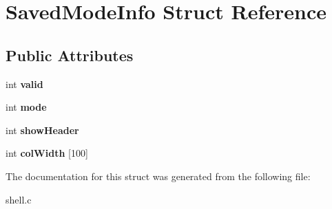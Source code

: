 \hypertarget{structSavedModeInfo}{}\section{Saved\+Mode\+Info Struct Reference}
\label{structSavedModeInfo}
\subsection*{Public Attributes}
\begin{DoxyCompactItemize}
\item 
int {\bfseries valid}\hypertarget{structSavedModeInfo_a43e863fb285c2aad913087572ebd5e27}{}\label{structSavedModeInfo_a43e863fb285c2aad913087572ebd5e27}

\item 
int {\bfseries mode}\hypertarget{structSavedModeInfo_ab6d30b28565d51ca017904f70b5edac6}{}\label{structSavedModeInfo_ab6d30b28565d51ca017904f70b5edac6}

\item 
int {\bfseries show\+Header}\hypertarget{structSavedModeInfo_a73fa5b451f94fa75fb5e27887831b8f4}{}\label{structSavedModeInfo_a73fa5b451f94fa75fb5e27887831b8f4}

\item 
int {\bfseries col\+Width} \mbox{[}100\mbox{]}\hypertarget{structSavedModeInfo_add96e86a9293b5e1bfd3ab92bf1a365f}{}\label{structSavedModeInfo_add96e86a9293b5e1bfd3ab92bf1a365f}

\end{DoxyCompactItemize}


The documentation for this struct was generated from the following file\+:\begin{DoxyCompactItemize}
\item 
shell.\+c\end{DoxyCompactItemize}
